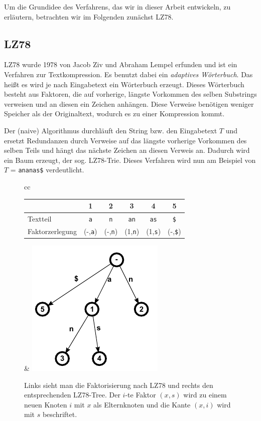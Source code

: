 \documentclass[a4paper,11pt]{scrartcl}%
\theoremstyle{change}
\theoremstyle{nonumberplain}
\theoremstyle{change}
\theoremstyle{nonumberplain}
\theoremstyle{change}
\theoremstyle{nonumberplain}
\begin{document}
Um die Grundidee des Verfahrens, das wir in dieser Arbeit entwickeln, zu erläutern, betrachten wir im Folgenden zunächst LZ78.

\subsection{LZ78}

LZ78 wurde 1978 von Jacob Ziv und Abraham Lempel erfunden und ist ein Verfahren zur Textkompression. Es benutzt dabei ein \textit{adaptives Wörterbuch}. Das heißt es wird je nach Eingabetext ein Wörterbuch erzeugt. Dieses Wörterbuch besteht aus Faktoren, die auf vorherige, längste Vorkommen des selben Substrings verweisen und an diesen ein Zeichen anhängen. Diese Verweise benötigen weniger Speicher als der Originaltext, wodurch es zu einer Kompression kommt.\cite[S.53ff]{managingGigabytes}

Der (naive) Algorithmus durchläuft den String bzw. den Eingabetext $T$ und ersetzt Redundanzen durch Verweise auf das längste vorherige Vorkommen des selben Teils und hängt das nächste Zeichen an diesen Verweis an. Dadurch wird ein Baum erzeugt, der sog. LZ78-Trie. Dieses Verfahren wird nun am Beispiel von $T$ = \texttt{ananas\$} verdeutlicht.\newpage
 	
	\begin{figure}[h]
	\begin{tabular}[t]{cc}
		\begin{tabular}[b]{l c c c c c}\hline
			& 1 & 2 & 3 & 4 & 5 \\ \hline
		   Textteil & \texttt{a} & \texttt{n} & \texttt{an} & \texttt{as} & \texttt{\$}\\ \hline
		   Faktorzerlegung & (-,\texttt{a}) & (-,\texttt{n}) & (1,\texttt{n}) & (1,\texttt{s}) &  (-,\texttt{\$})\\ \hline
		\end{tabular} & \includegraphics{./pics/ananas_LZ78Tree}
	\end{tabular}
	\caption{Links sieht man die Faktorisierung nach LZ78 und rechts den entsprechenden LZ78-Tree. Der $i$-te Faktor $(x,s)$ wird zu einem neuen Knoten $i$ mit $x$ als Elternknoten und die Kante $(x,i)$ wird mit $s$ beschriftet.}
	\label{fig:lz78}
	\end{figure}
\end{document}
